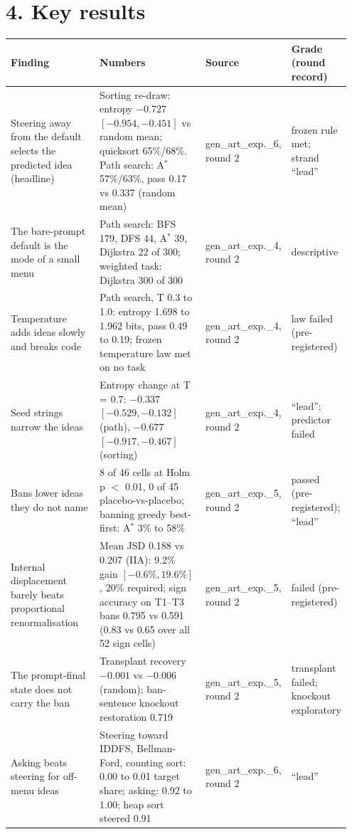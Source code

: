 \documentclass[10pt,letterpaper]{article}
\begin{document}
\section*{4. Key results}

\begin{center}
\footnotesize
\setlength{\tabcolsep}{3pt}
\begin{tabular}{@{}L{0.30\linewidth}L{0.37\linewidth}L{0.13\linewidth}L{0.15\linewidth}@{}}
\toprule
\textbf{Finding} & \textbf{Numbers} & \textbf{Source} & \textbf{Grade (round record)} \\
\midrule
Steering away from the default selects the predicted idea (headline) & Sorting re-draw: entropy $-0.727$ $[-0.954, -0.451]$ vs random mean; quicksort 65\%/68\%. Path search: A$^*$ 57\%/63\%, pass 0.17 vs 0.337 (random mean) & gen\_art\_exp.\_6, round 2 & frozen rule met; strand ``lead'' \\
The bare-prompt default is the mode of a small menu & Path search: BFS 179, DFS 44, A$^*$ 39, Dijkstra 22 of 300; weighted task: Dijkstra 300 of 300 & gen\_art\_exp.\_4, round 2 & descriptive \\
Temperature adds ideas slowly and breaks code & Path search, T 0.3 to 1.0: entropy 1.698 to 1.962 bits, pass 0.49 to 0.19; frozen temperature law met on no task & gen\_art\_exp.\_4, round 2 & law failed (pre-registered) \\
Seed strings narrow the ideas & Entropy change at T = 0.7: $-0.337$ $[-0.529, -0.132]$ (path), $-0.677$ $[-0.917, -0.467]$ (sorting) & gen\_art\_exp.\_4, round 2 & ``lead''; predictor failed \\
Bans lower ideas they do not name & 8 of 46 cells at Holm p $<$ 0.01, 0 of 45 placebo-vs-placebo; banning greedy best-first: A$^*$ 3\% to 58\% & gen\_art\_exp.\_5, round 2 & passed (pre-registered); ``lead'' \\
Internal displacement barely beats proportional renormalisation & Mean JSD 0.188 vs 0.207 (IIA): 9.2\% gain $[-0.6\%, 19.6\%]$, 20\% required; sign accuracy on T1--T3 bans 0.795 vs 0.591 (0.83 vs 0.65 over all 52 sign cells) & gen\_art\_exp.\_5, round 2 & failed (pre-registered) \\
The prompt-final state does not carry the ban & Transplant recovery $-0.001$ vs $-0.006$ (random); ban-sentence knockout restoration 0.719 & gen\_art\_exp.\_5, round 2 & transplant failed; knockout exploratory \\
Asking beats steering for off-menu ideas & Steering toward IDDFS, Bellman-Ford, counting sort: 0.00 to 0.01 target share; asking: 0.92 to 1.00; heap sort steered 0.91 & gen\_art\_exp.\_6, round 2 & ``lead'' \\

\end{tabular}
\end{center}
\end{document}

